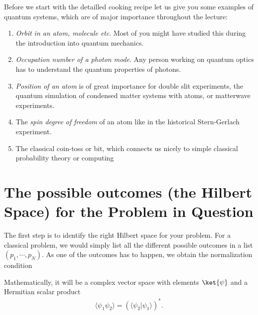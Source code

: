 Before we start with the detailled cooking recipe let us give you some examples of  quantum systems, which are of major importance throughout the lecture:
\begin{enumerate}
\item \textit{Orbit in an atom, molecule etc}. Most of you might have studied this during the introduction into quantum mechanics.
\item \textit{Occupation number of a photon mode}. Any person working on quantum optics has to understand the quantum properties of photons.
\item \textit{Position of an atom} is of great importance for double slit experiments, the quantum simulation of condensed matter systems with atoms,  or matterwave experiments.
\item The \textit{spin degree of freedom} of an atom like in the historical Stern-Gerlach experiment. 
\item The classical coin-toss or bit, which connects us nicely to simple classical probability theory or computing
\end{enumerate}

\section{The possible outcomes  (the Hilbert Space) for the Problem in Question}



The first step is to identify the right Hilbert space for your problem. For a classical problem, we would simply list all the different possible outcomes in a list $(p_1, \cdots, p_N)$. As one of the outcomes has to happen, we obtain the normalization condition

Mathematically, it will be a complex vector space with elements $\ket{\psi}$ and a Hermitian scalar product
\begin{align}
				\langle\psi_1 \psi_2\rangle=(\langle{\psi_2}| \psi_1\rangle)^*.
\end{align}

